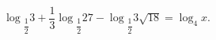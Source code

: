 \begin{ex}[type=equation]
	\begin{condition}
		 $\log$\tiny$_{\dfrac{1}{2}}$\normalsize$ 3  + \dfrac{1}{3}\log$\tiny$_{\dfrac{1}{2}}$\normalsize$27 - \log$\tiny$_{\dfrac{1}{2}}$\normalsize$ 3\sqrt{18}= \log_4 x.$
	\end{condition}
\end{ex}